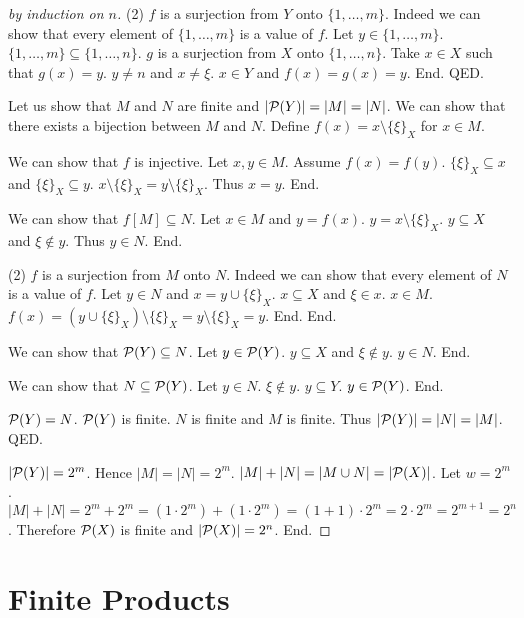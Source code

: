 \documentclass{article}
\newcommand{\Seq}[2]{\{#1,\dots,#2\}}
\newcommand{\pow}{{\cal P}}
\newcommand{\sset}[2]{\{#1\}_{#2}}
\begin{document}
\begin{forthel}
\begin{proof}[by induction on $n$]
      (2) $f$ is a surjection from $Y$ onto $\Seq{1}{m}$.
      Indeed we can show that every element of $\Seq{1}{m}$ is a value of $f$.
        Let $y \in \Seq{1}{m}$. $\Seq{1}{m} \subseteq \Seq{1}{n}$. $g$ is a surjection from $X$ onto $\Seq{1}{n}$.
        Take $x \in X$ such that $g(x) = y$. $y \neq n$ and $x \neq \xi$. $x \in Y$ and $f(x) = g(x) = y$. End.
    QED.


    Let us show that $M$ and $N$ are finite and $|\pow(Y)| = |M| = |N|$.
      We can show that there exists a bijection between $M$ and $N$.
        Define $f(x) = x \setminus \sset{\xi}{X}$ for $x \in M$.

        We can show that $f$ is injective.
          Let $x,y \in M$. Assume $f(x) = f(y)$. $\sset{\xi}{X} \subseteq x$ and $\sset{\xi}{X} \subseteq y$.
          $x \setminus \sset{\xi}{X} = y \setminus \sset{\xi}{X}$. Thus $x = y$. End.

        We can show that $f[M] \subseteq N$.
          Let $x \in M$ and $y = f(x)$. $y = x \setminus \sset{\xi}{X}$. $y \subseteq X$ and $\xi \notin y$. Thus $y \in N$. End.

        (2) $f$ is a surjection from $M$ onto $N$.
        Indeed we can show that every element of $N$ is a value of $f$.
          Let $y \in N$ and $x = y \cup \sset{\xi}{X}$. $x \subseteq X$ and $\xi \in x$. $x \in M$.
          $f(x) = (y \cup \sset{\xi}{X}) \setminus \sset{\xi}{X} = y \setminus \sset{\xi}{X} = y$. End.
      End.

      We can show that $\pow(Y) \subseteq N$.
        Let $y \in \pow(Y)$. $y \subseteq X$ and $\xi \notin y$. $y \in N$. End.

      We can show that $N \subseteq \pow(Y)$.
        Let $y \in N$. $\xi \notin y$. $y \subseteq Y$. $y \in \pow(Y)$. End.


      $\pow(Y) = N$. $\pow(Y)$ is finite. $N$ is finite and $M$ is finite.
      Thus $|\pow(Y)| = |N| = |M|$.
    QED.

    $|\pow(Y)| = 2^{m}$. Hence $|M| = |N| = 2^{m}$. $|M| + |N| = |M \cup N| = |\pow(X)|$. Let $w = 2^{m}$.
    $|M| + |N| = 2^{m} + 2^{m} = (1 \cdot 2^{m}) + (1 \cdot 2^{m}) = (1 + 1) \cdot 2^{m} =  2 \cdot 2^{m} = 2^{m+1} = 2^{n}$.
    Therefore $\pow(X)$ is finite and $|\pow(X)| = 2^{n}$.
  End.
  \end{proof}

  \end{forthel}



\section{Finite Products}
\end{document}
